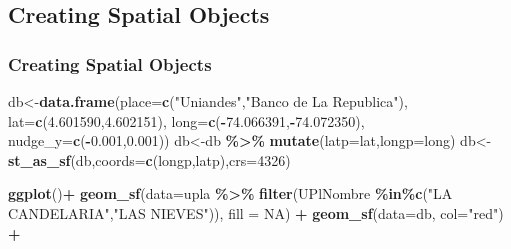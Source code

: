 \documentclass[
  shownotes,
  xcolor={svgnames},
  hyperref={colorlinks,citecolor=DarkBlue,linkcolor=DarkRed,urlcolor=DarkBlue}
   , aspectratio=169]{beamer}
\newenvironment{Shaded}{\begin{snugshade}}{\end{snugshade}}
\newcommand{\DataTypeTok}[1]{\textcolor[rgb]{0.13,0.29,0.53}{#1}}
\newcommand{\DecValTok}[1]{\textcolor[rgb]{0.00,0.00,0.81}{#1}}
\newcommand{\FloatTok}[1]{\textcolor[rgb]{0.00,0.00,0.81}{#1}}
\newcommand{\KeywordTok}[1]{\textcolor[rgb]{0.13,0.29,0.53}{\textbf{#1}}}
\newcommand{\NormalTok}[1]{#1}
\newcommand{\OperatorTok}[1]{\textcolor[rgb]{0.81,0.36,0.00}{\textbf{#1}}}
\newcommand{\OtherTok}[1]{\textcolor[rgb]{0.56,0.35,0.01}{#1}}
\newcommand{\StringTok}[1]{\textcolor[rgb]{0.31,0.60,0.02}{#1}}
\begin{document}
\subsection{Creating Spatial Objects}
\begin{frame}[fragile]
\frametitle{Creating Spatial Objects}

\begin{scriptsize}
\begin{Shaded}
\begin{Highlighting}[]
\NormalTok{db\textless{}{-}}\KeywordTok{data.frame}\NormalTok{(}\DataTypeTok{place=}\KeywordTok{c}\NormalTok{(}\StringTok{"Uniandes"}\NormalTok{,}\StringTok{"Banco de La Republica"}\NormalTok{),}
        \DataTypeTok{lat=}\KeywordTok{c}\NormalTok{(}\FloatTok{4.601590}\NormalTok{,}\FloatTok{4.602151}\NormalTok{), }
        \DataTypeTok{long=}\KeywordTok{c}\NormalTok{(}\OperatorTok{{-}}\FloatTok{74.066391}\NormalTok{,}\OperatorTok{{-}}\FloatTok{74.072350}\NormalTok{), }
        \DataTypeTok{nudge\_y=}\KeywordTok{c}\NormalTok{(}\OperatorTok{{-}}\FloatTok{0.001}\NormalTok{,}\FloatTok{0.001}\NormalTok{))}
\NormalTok{db\textless{}{-}db }\OperatorTok{\%\textgreater{}\%}\StringTok{ }\KeywordTok{mutate}\NormalTok{(}\DataTypeTok{latp=}\NormalTok{lat,}\DataTypeTok{longp=}\NormalTok{long)}
\NormalTok{db\textless{}{-}}\KeywordTok{st\_as\_sf}\NormalTok{(db,}\DataTypeTok{coords=}\KeywordTok{c}\NormalTok{(}\StringTok{\textquotesingle{}longp\textquotesingle{}}\NormalTok{,}\StringTok{\textquotesingle{}latp\textquotesingle{}}\NormalTok{),}\DataTypeTok{crs=}\DecValTok{4326}\NormalTok{)}
\end{Highlighting}
\end{Shaded}
\end{scriptsize}
\begin{minipage}[t]{0.52\linewidth}
        \begin{tiny}
        \begin{Shaded}
\begin{Highlighting}[]
\KeywordTok{ggplot}\NormalTok{()}\OperatorTok{+}
\StringTok{  }\KeywordTok{geom\_sf}\NormalTok{(}\DataTypeTok{data=}\NormalTok{upla }
    \OperatorTok{\%\textgreater{}\%}\StringTok{ }\KeywordTok{filter}\NormalTok{(UPlNombre}
    \OperatorTok{\%in\%}\KeywordTok{c}\NormalTok{(}\StringTok{"LA CANDELARIA"}\NormalTok{,}\StringTok{"LAS NIEVES"}\NormalTok{)), }\DataTypeTok{fill =} \OtherTok{NA}\NormalTok{) }\OperatorTok{+}
\StringTok{  }\KeywordTok{geom\_sf}\NormalTok{(}\DataTypeTok{data=}\NormalTok{db, }\DataTypeTok{col=}\StringTok{"red"}\NormalTok{) }\OperatorTok{+}

\end{Highlighting}
\end{Shaded}
\end{tiny}
\end{minipage}
\end{frame}
\end{document}
